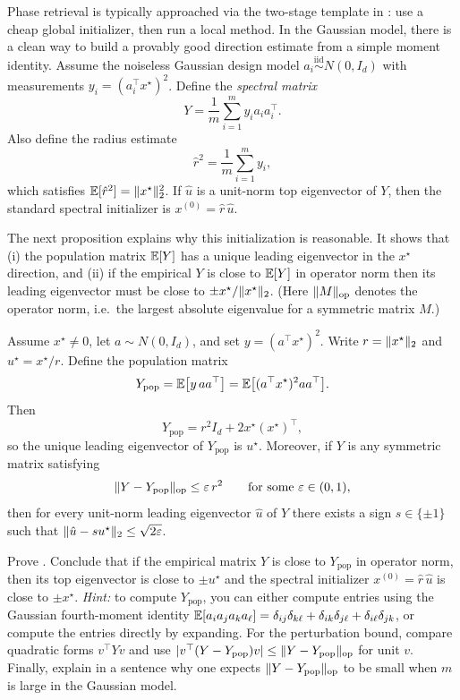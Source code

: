 \documentclass[11pt]{article}
\begin{document}
Phase retrieval is typically approached via the two-stage template in :
use a cheap global initializer, then run a local method.
In the Gaussian model, there is a clean way to build a provably good direction estimate from a simple moment identity.
Assume the noiseless Gaussian design model $a_i \stackrel{\mathrm{iid}}{\sim} N(0,I_d)$ with measurements $y_i=(a_i^\top x^\star)^2$.
Define the \emph{spectral matrix}
\[
  Y = \frac{1}{m}\sum_{i=1}^m y_i a_i a_i^\top.
\]
Also define the radius estimate
\[
  \hat r^2 = \frac{1}{m}\sum_{i=1}^m y_i,
\]
which satisfies $\mathbb{E}[\hat r^2]=\lVert x^\star\rVert_2^2$.
If $\hat u$ is a unit-norm top eigenvector of $Y$, then the standard spectral initializer is $x^{(0)}=\hat r\,\hat u$.

The next proposition explains why this initialization is reasonable.
It shows that (i) the population matrix $\mathbb{E}[Y]$ has a unique leading eigenvector in the $x^\star$ direction, and (ii) if the empirical $Y$ is close to $\mathbb{E}[Y]$ in operator norm then its leading eigenvector must be close to $\pm x^\star/\lVert x^\star\rVert_2$.
(Here $\lVert M\rVert_{\mathrm{op}}$ denotes the operator norm, i.e.\ the largest absolute eigenvalue for a symmetric matrix $M$.)

\begin{proposition}
\label{prop:phase-spectral-init}
Assume $x^\star\neq 0$, let $a\sim N(0,I_d)$, and set $y=(a^\top x^\star)^2$.
Write $r=\lVert x^\star\rVert_2$ and $u^\star=x^\star/r$.
Define the population matrix
\[
  Y_{\mathrm{pop}} = \mathbb{E}\big[y\,a a^\top\big]
  = \mathbb{E}\big[(a^\top x^\star)^2 a a^\top\big].
\]
Then
\[
  Y_{\mathrm{pop}}=r^2 I_d + 2x^\star(x^\star)^\top,
\]
so the unique leading eigenvector of $Y_{\mathrm{pop}}$ is $u^\star$.
Moreover, if $Y$ is any symmetric matrix satisfying
\[
\lVert Y-Y_{\mathrm{pop}}\rVert_{\mathrm{op}} \le \varepsilon\, r^2
\qquad\text{for some }\varepsilon\in(0,1),
\]
then for every unit-norm leading eigenvector $\hat u$ of $Y$ there exists a sign $s\in\{\pm 1\}$ such that
$\lVert\hat u-su^\star\rVert_2\le \sqrt{2\varepsilon}$.
\end{proposition}

\begin{exercise}
\label{ex:phase-spectral-spike}
Prove .
Conclude that if the empirical matrix $Y$ is close to $Y_{\mathrm{pop}}$ in operator norm, then its top eigenvector is close to $\pm u^\star$ and the spectral initializer $x^{(0)}=\hat r\,\hat u$ is close to $\pm x^\star$.
\emph{Hint:} to compute $Y_{\mathrm{pop}}$, you can either compute entries using the Gaussian fourth-moment identity
$\mathbb{E}[a_i a_j a_k a_\ell]=\delta_{ij}\delta_{k\ell}+\delta_{ik}\delta_{j\ell}+\delta_{i\ell}\delta_{jk}$,
or compute the entries directly by expanding.
For the perturbation bound, compare quadratic forms $v^\top Y v$ and use $|v^\top (Y-Y_{\mathrm{pop}}) v|\le \lVert Y-Y_{\mathrm{pop}}\rVert_{\mathrm{op}}$ for unit $v$.
Finally, explain in a sentence why one expects $\lVert Y-Y_{\mathrm{pop}}\rVert_{\mathrm{op}}$ to be small when $m$ is large in the Gaussian model.
\end{exercise}
\end{document}
